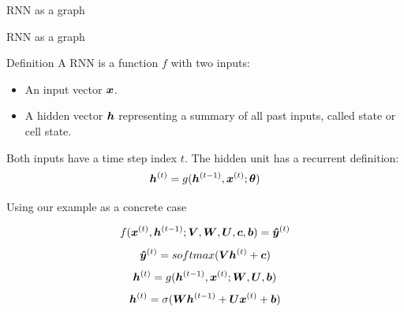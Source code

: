 \documentclass[10pt]{beamer}
\begin{document}
\begin{frame}{RNN as a graph}

\end{frame}

\begin{frame}{RNN as a graph}

\end{frame}


\begin{frame}{Definition}
A RNN is a function $f$ with two inputs:
\vspace{0.2cm}
\begin{itemize}
\item An input vector $\bm{x}$.
\vspace{0.1cm}
\item A hidden vector $\bm{h}$ representing a summary of all past inputs, called \alert{state} or \alert{cell state}.
\end{itemize}

\vspace{0.2cm}
Both inputs have a time step index $t$. The hidden unit has a recurrent definition:
\vspace{0.2cm}
\Large{
\begin{equation*}
\bm{h}^{(t)} = g(\bm{h}^{(t-1)}, \bm{x}^{(t)}; \bm{\theta})
\end{equation*}
}
\end{frame}


\begin{frame}{Using our example as a concrete case}

\Large{
 \vspace{0.2cm}
\begin{equation*}
f(\bm{x}^{(t)}, \bm{h}^{(t-1)}; \bm{V}, \bm{W}, \bm{U}, \bm{c}, \bm{b}) = \bm{\hat{y}}^{(t)}
\end{equation*}
 \vspace{0.2cm}
\begin{equation*}
\bm{\hat{y}}^{(t)} = softmax(\bm{V} \bm{h}^{(t)} + \bm{c})
\end{equation*}
\vspace{0.2cm}
 \begin{equation*}
\bm{h}^{(t)} = g(\bm{h}^{(t-1)}, \bm{x}^{(t)}; \bm{W},\bm{U}, \bm{b})
\end{equation*}
\vspace{0.2cm}
\begin{equation*}
\bm{h}^{(t)} = \sigma(\bm{W} \bm{h}^{(t-1)} + \bm{U} \bm{x}^{(t)} + \bm{b})
\end{equation*}
}

\end{frame}
\end{document}
